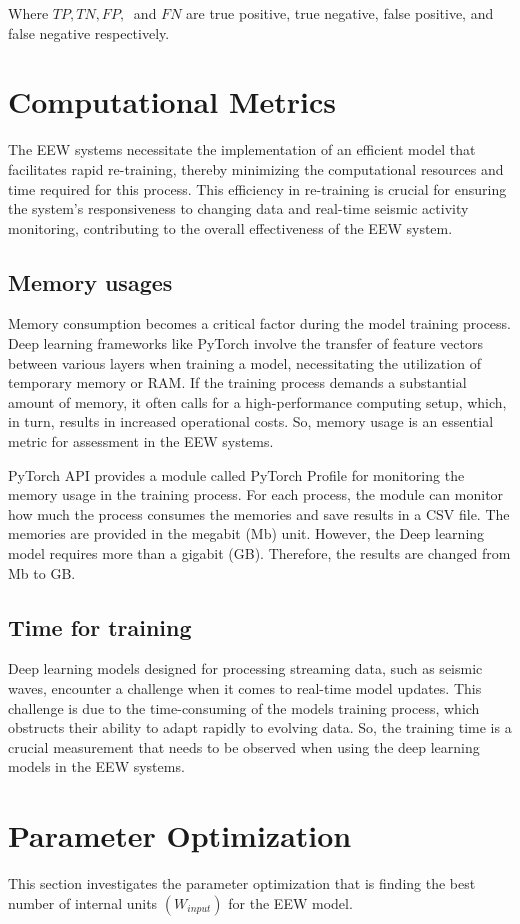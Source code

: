 Where $TP, TN, FP,\ $ and $FN$ are true positive, true negative, false positive, and false negative respectively.
\section{Computational Metrics}
The EEW systems necessitate the implementation of an efficient model that facilitates rapid re-training, thereby minimizing the computational resources and time required for this process. This efficiency in re-training is crucial for ensuring the system's responsiveness to changing data and real-time seismic activity monitoring, contributing to the overall effectiveness of the EEW system.
\subsection{Memory usages}
Memory consumption becomes a critical factor during the model training process. Deep learning frameworks like PyTorch involve the transfer of feature vectors between various layers when training a model, necessitating the utilization of temporary memory or RAM. If the training process demands a substantial amount of memory, it often calls for a high-performance computing setup, which, in turn, results in increased operational costs. So, memory usage is an essential metric for assessment in the EEW systems.

PyTorch API provides a module called PyTorch Profile for monitoring the memory usage in the training process. For each process, the module can monitor how much the process consumes the memories and save results in a CSV file. The memories are provided in the megabit (Mb) unit. However, the Deep learning model requires more than a gigabit (GB). Therefore, the results are changed from Mb to GB.

\subsection{Time for training}
Deep learning models designed for processing streaming data, such as seismic waves, encounter a challenge when it comes to real-time model updates. This challenge is due to the time-consuming of the models training process, which obstructs their ability to adapt rapidly to evolving data. So, the training time is a crucial measurement that needs to be observed when using the deep learning models in the EEW systems.

\section{Parameter Optimization}
This section investigates the parameter optimization that is finding the best number of internal units $(W_{input})$ for the EEW model.

